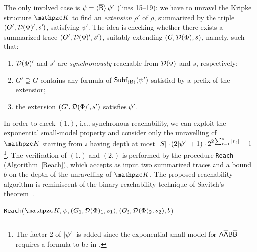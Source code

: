 The only involved case is $\psi=\operatorname{\langle \overline{B}\rangle}\psi'$ (lines 15--19): we have to unravel the Kripke structure $\Ku$ to find an \emph{extension} $\rho'$ of $\rho$, summarized by the triple $(G',\mathcal{D}(\Phi)',s')$, satisfying $\psi'$. The idea is 
checking whether there exists a summarized 
trace $(G',\mathcal{D}(\Phi)',s')$, suitably extending $(G,\mathcal{D}(\Phi),s)$, namely, such that:
\begin{enumerate}
\item $\mathcal{D}(\Phi)'$ and $s'$ are \emph{synchronously} reachable from $\mathcal{D}(\Phi)$ and $s$, respectively; 
\item $G'\supseteq G$ contains any formula of $\mathsf{Subf}_{\operatorname{\langle B\rangle}}(\psi')$ satisfied by a prefix of the extension; 
\item the extension
$(G',\mathcal{D}(\Phi)',s')$ satisfies $\psi'$.
\end{enumerate}

In order to check $(1.)$, i.e., synchronous reachability,
we can exploit the exponential small-model property and 
consider only the unravelling of $\Ku$ starting from $s$ having depth at most $|S|\cdot (2|\psi'|+1)\cdot 2^{2\sum_{\ell=1}^u |r_\ell|} -1$\footnote{
The factor 2 of $|\psi'|$ is added since the exponential small-model for $\mathsf{A\overline{A}B\overline{B}}$ requires a formula to be in \nnf .
}.
The verification of $(1.)$ and $(2.)$ is performed by the procedure
\texttt{Reach} (Algorithm~\ref{Reach}), which accepts as input two summarized traces and a bound $b$ on the depth of the unravelling of $\Ku$.
The proposed reachability algorithm is reminiscent of  the binary reachability technique of Savitch's theorem~\cite{Garey79}. 

\begin{algorithm}[tp]
    \caption{\texttt{Reach}($\Ku,\psi,(G_1,\Du(\Phi)_1,s_1),(G_2,\Du(\Phi)_2,s_2),b$)}\label{Reach}
    \begin{algorithmic}[1]
        \Else{}
                    \Return{$\top$}
                \EndIf
            \EndFor
            \Return{$\bot$}
        \EndIf
    \end{algorithmic}
\end{algorithm}

